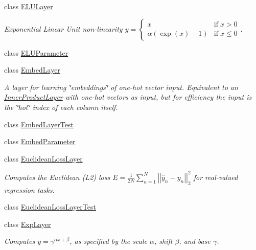 \begin{DoxyCompactItemize}
class \mbox{\hyperlink{classcaffe_1_1_e_l_u_layer}{E\+L\+U\+Layer}}
\begin{DoxyCompactList}\small\item\em Exponential Linear Unit non-\/linearity $ y = \left\{ \begin{array}{lr} x & \mathrm{if} \; x > 0 \\ \alpha (\exp(x)-1) & \mathrm{if} \; x \le 0 \end{array} \right. $. ~\newline
 \end{DoxyCompactList}\item 
class \mbox{\hyperlink{classcaffe_1_1_e_l_u_parameter}{E\+L\+U\+Parameter}}
\item 
class \mbox{\hyperlink{classcaffe_1_1_embed_layer}{Embed\+Layer}}
\begin{DoxyCompactList}\small\item\em A layer for learning \char`\"{}embeddings\char`\"{} of one-\/hot vector input. Equivalent to an \mbox{\hyperlink{classcaffe_1_1_inner_product_layer}{Inner\+Product\+Layer}} with one-\/hot vectors as input, but for efficiency the input is the \char`\"{}hot\char`\"{} index of each column itself. \end{DoxyCompactList}\item 
class \mbox{\hyperlink{classcaffe_1_1_embed_layer_test}{Embed\+Layer\+Test}}
\item 
class \mbox{\hyperlink{classcaffe_1_1_embed_parameter}{Embed\+Parameter}}
\item 
class \mbox{\hyperlink{classcaffe_1_1_euclidean_loss_layer}{Euclidean\+Loss\+Layer}}
\begin{DoxyCompactList}\small\item\em Computes the Euclidean (L2) loss $ E = \frac{1}{2N} \sum\limits_{n=1}^N \left| \left| \hat{y}_n - y_n \right| \right|_2^2 $ for real-\/valued regression tasks. \end{DoxyCompactList}\item 
class \mbox{\hyperlink{classcaffe_1_1_euclidean_loss_layer_test}{Euclidean\+Loss\+Layer\+Test}}
\item 
class \mbox{\hyperlink{classcaffe_1_1_exp_layer}{Exp\+Layer}}
\begin{DoxyCompactList}\small\item\em Computes $ y = \gamma ^ {\alpha x + \beta} $, as specified by the scale $ \alpha $, shift $ \beta $, and base $ \gamma $. \end{DoxyCompactList}\item 

\end{DoxyCompactItemize}
